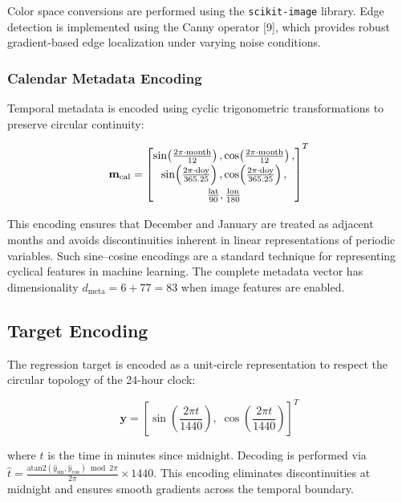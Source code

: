 \documentclass[9pt, a4paper, twocolumn]{article}
\begin{document}
Color space conversions are performed using the \texttt{scikit-image} library. Edge detection is implemented using the Canny operator [9], which provides robust gradient-based edge localization under varying noise conditions.

\subsubsection{Calendar Metadata Encoding}

Temporal metadata is encoded using cyclic trigonometric transformations to preserve circular continuity:

\begin{equation}
{
\renewcommand{\arraystretch}{1.4}
\mathbf{m}_{\text{cal}} =
\begin{bmatrix}
\sin\!\left(\frac{2\pi \cdot \text{month}}{12}\right),
\cos\!\left(\frac{2\pi \cdot \text{month}}{12}\right), \\
\sin\!\left(\frac{2\pi \cdot \text{doy}}{365.25}\right),
\cos\!\left(\frac{2\pi \cdot \text{doy}}{365.25}\right), \\
\frac{\text{lat}}{90},
\frac{\text{lon}}{180}
\end{bmatrix}^T
}
\end{equation}

This encoding ensures that December and January are treated as adjacent months and avoids discontinuities inherent in linear representations of periodic variables. Such sine--cosine encodings are a standard technique for representing cyclical features in machine learning. The complete metadata vector has dimensionality $d_{\text{meta}} = 6 + 77 = 83$ when image features are enabled.

\subsection{Target Encoding}

The regression target is encoded as a unit-circle representation to respect the circular topology of the 24-hour clock:

\begin{equation}
\mathbf{y} = \left[\sin\!\left(\frac{2\pi t}{1440}\right),\;
\cos\!\left(\frac{2\pi t}{1440}\right)\right]^T
\end{equation}

where $t$ is the time in minutes since midnight. Decoding is performed via $\hat{t} = \frac{\text{atan2}(\hat{y}_{\sin}, \hat{y}_{\cos}) \bmod 2\pi}{2\pi} \times 1440$. This encoding eliminates discontinuities at midnight and ensures smooth gradients across the temporal boundary.
\end{document}
